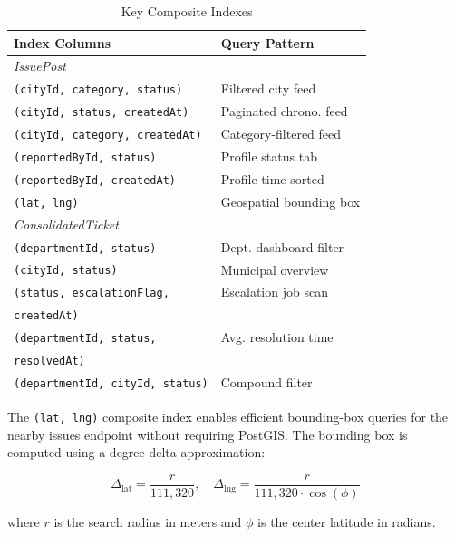 \documentclass[conference]{IEEEtran}
\begin{document}
\begin{table}[htbp]
\caption{Key Composite Indexes}
\begin{center}
\begin{tabular}{ll}
\toprule
\textbf{Index Columns} & \textbf{Query Pattern} \\
\midrule
\multicolumn{2}{l}{\textit{IssuePost}} \\
\texttt{(cityId, category, status)} & Filtered city feed \\
\texttt{(cityId, status, createdAt)} & Paginated chrono. feed \\
\texttt{(cityId, category, createdAt)} & Category-filtered feed \\
\texttt{(reportedById, status)} & Profile status tab \\
\texttt{(reportedById, createdAt)} & Profile time-sorted \\
\texttt{(lat, lng)} & Geospatial bounding box \\
\midrule
\multicolumn{2}{l}{\textit{ConsolidatedTicket}} \\
\texttt{(departmentId, status)} & Dept. dashboard filter \\
\texttt{(cityId, status)} & Municipal overview \\
\texttt{(status, escalationFlag,} & Escalation job scan \\
\quad\texttt{createdAt)} & \\
\texttt{(departmentId, status,} & Avg. resolution time \\
\quad\texttt{resolvedAt)} & \\
\texttt{(departmentId, cityId, status)} & Compound filter \\
\bottomrule
\end{tabular}
\label{tab:indexes}
\end{center}
\end{table}

The \texttt{(lat, lng)} composite index enables efficient bounding-box queries for the nearby issues endpoint without requiring PostGIS. The bounding box is computed using a degree-delta approximation:

\begin{equation}
\Delta_{\text{lat}} = \frac{r}{111{,}320}, \quad
\Delta_{\text{lng}} = \frac{r}{111{,}320 \cdot \cos(\phi)}
\label{eq:bbox}
\end{equation}

\noindent where $r$ is the search radius in meters and $\phi$ is the center latitude in radians.
\end{document}

